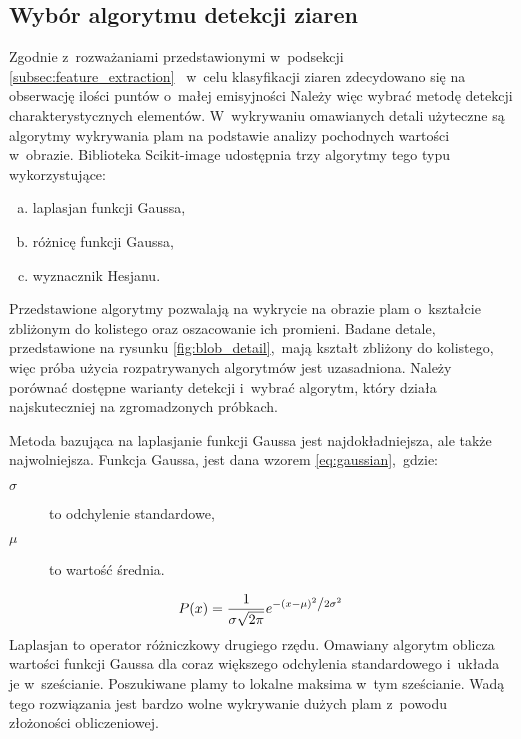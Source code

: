 \subsection{Wybór algorytmu detekcji ziaren}
\label{subsec:blob_detect}
Zgodnie z~rozważaniami przedstawionymi w~podsekcji
\ref{subsec:feature_extraction}~%
w~celu klasyfikacji ziaren zdecydowano się na obserwację ilości puntów o~małej
emisyjności
Należy więc wybrać metodę detekcji charakterystycznych elementów.
W~wykrywaniu omawianych detali użyteczne są algorytmy wykrywania plam na
podstawie analizy pochodnych wartości w~obrazie.
Biblioteka Scikit-image udostępnia trzy algorytmy tego typu wykorzystujące:
\begin{enumerate}[a)]
    \item laplasjan funkcji Gaussa,
    \item różnicę funkcji Gaussa,
    \item wyznacznik Hesjanu.
\end{enumerate}
Przedstawione algorytmy pozwalają na wykrycie na obrazie plam o~kształcie
zbliżonym do kolistego oraz oszacowanie ich promieni.
Badane detale, przedstawione na rysunku \ref{fig:blob_detail},~mają kształt
zbliżony do kolistego, więc próba użycia rozpatrywanych algorytmów jest
uzasadniona.
Należy porównać dostępne warianty detekcji i~wybrać algorytm, który działa
najskuteczniej na zgromadzonych próbkach.

Metoda bazująca na laplasjanie funkcji Gaussa jest najdokładniejsza, ale także
najwolniejsza.
Funkcja Gaussa, jest dana wzorem \ref{eq:gaussian},~gdzie:
\begin{description}
    \item[$ \sigma $] to odchylenie standardowe,
    \item[$ \mu $] to wartość średnia.
\end{description}
\begin{equation}
    P(x) = \frac{1}{{\sigma \sqrt {2\pi } }}
    e^{{{ - \left( {x - \mu } \right)^2 }
    \mathord{\left/ {\vphantom {{ - \left( {x - \mu } \right)^2 }
            {2\sigma ^2 }}} \right. \kern-\nulldelimiterspace} {2\sigma ^2 }}}
    \label{eq:gaussian}
\end{equation}
Laplasjan to operator różniczkowy drugiego rzędu.
Omawiany algorytm oblicza wartości funkcji Gaussa dla coraz większego odchylenia
standardowego i~układa je w~sześcianie.
Poszukiwane plamy to lokalne maksima w~tym sześcianie.
Wadą tego rozwiązania jest bardzo wolne wykrywanie dużych plam z~powodu
złożoności obliczeniowej.


